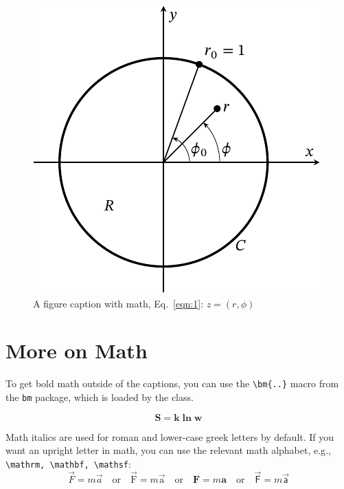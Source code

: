 \documentclass[largesc,upint,varvw,barcolor=Red4,nocopyright,hyphenate,balance,lang-second=french,lang=english]{asmejour}
\begin{document}

\begin{figure}
\centering\includegraphics[width=0.7\linewidth]{sample-figure-1.pdf}
\caption{A figure caption with math, Eq.~\eqref{eqn:1}: $z = (r,\phi)$ \cite{Lienhard2019b}\label{fig:1}}
\end{figure}
 


\section{More on Math}

To get bold math outside of the captions, you can use the \verb|\bm{..}| macro from the \texttt{bm} package, which is loaded by the class.

\begin{equation}
\bm{ S = k \ln w}
\end{equation}

Math italics are used for roman and lower-case greek letters by default.  If you want an upright letter in math, you can use the relevant math alphabet, e.g., \verb|\mathrm, \mathbf, \mathsf|:
\begin{equation}\label{eqn:newton2}
\vec{F} = m \vec{a} \quad\textrm{or}\quad \vec{\mathrm{F}} = m \vec{\mathrm{a}} \quad\textrm{or}\quad \mathbf{F} = m \mathbf{a} \quad\textrm{or}\quad \vec{\mathsf{F}} = m \vec{\mathsf{a}}
\end{equation}
\end{document}
